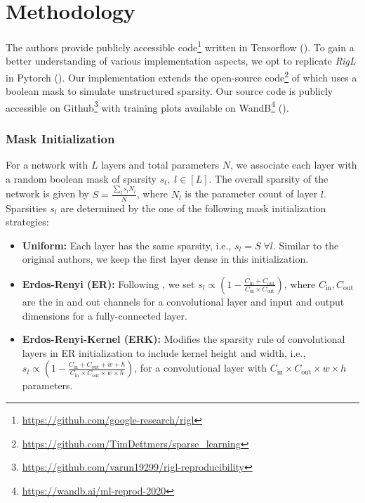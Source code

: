 \section{Methodology}

The authors provide publicly accessible code\footnote{\href{https://github.com/google-research/rigl}{https://github.com/google-research/rigl}} written in Tensorflow (\citet{abadi2016tensorflow}). To gain a better understanding of various implementation aspects, we opt to replicate \textit{RigL} in Pytorch (\citet{Pytorch}). Our implementation extends the open-source code\footnote{\href{https://github.com/TimDettmers/sparse_learning}{https://github.com/TimDettmers/sparse\_learning}} of \citet{dettmers2020sparse} which uses a boolean mask to simulate unstructured sparsity. Our source code is publicly accessible on Github\footnote{\href{https://github.com/varun19299/rigl-reproducibility}{https://github.com/varun19299/rigl-reproducibility}} with training plots available on WandB\footnote{\href{https://wandb.ai/ml-reprod-2020}{https://wandb.ai/ml-reprod-2020}} (\citet{wandb}).


\subsubsection{Mask Initialization} For a network with $L$ layers and total parameters $N$, we associate each layer with a random boolean mask of sparsity $s_l, \; l \in [L]$. The overall sparsity of the network is given by $S=\frac{\sum_l s_l N_l}{N}$, where $N_l$ is the parameter count of layer $l$. Sparsities $s_l$ are determined by the one of the following mask initialization strategies:

\begin{itemize}
    \item \textbf{Uniform:} Each layer has the same sparsity, i.e., $s_l = S \; \forall l$. Similar to the original authors, we keep the first layer dense in this initialization.
    
    \item \textbf{Erdos-Renyi (ER):} Following \citet{Mocanu2018SET}, we set $s_l \propto \left(1 - \frac{C_\text{in} + C_\text{out}}{C_\text{in} \times C_\text{out}} \right)$, where $C_\text{in}, C_\text{out}$ are the in and out channels for a convolutional layer and input and output dimensions for a fully-connected layer. 
    
    \item \textbf{Erdos-Renyi-Kernel (ERK):} Modifies the sparsity rule of convolutional layers in ER initialization to include kernel height and width, i.e., $s_l \propto \left(1 - \frac{C_\text{in} + C_\text{out} + w + h}{C_\text{in} \times C_\text{out} \times w \times h} \right)$, for a convolutional layer with $C_\text{in} \times C_\text{out} \times w \times h$ parameters. 
\end{itemize}


